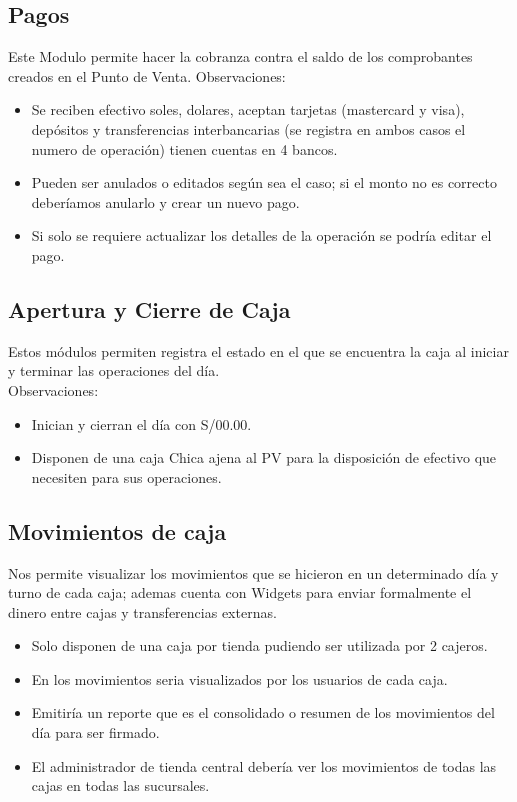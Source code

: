 \documentclass[pdftex,12pt,oneside,a4paper,spanish, english, brazil]{abntex2}
\begin{document}
\begin{sloppypar}
              \subsection{Pagos}
              Este Modulo permite hacer la cobranza contra el saldo de los comprobantes creados en el Punto de Venta.
              Observaciones:
              \begin{itemize}
              	\item Se reciben efectivo soles, dolares, aceptan tarjetas (mastercard y visa), depósitos y transferencias interbancarias (se registra en ambos casos el numero de operación) tienen cuentas en 4 bancos.
              	\item Pueden ser anulados o editados según sea el caso; si el monto no es correcto deberíamos anularlo y crear un nuevo pago.
              	\item Si solo se requiere actualizar los detalles de la operación se podría editar el pago.
              \end{itemize}
              
              
              \subsection{Apertura y Cierre de Caja}
              Estos módulos permiten registra el estado en el que se encuentra la caja al iniciar y terminar las operaciones del día.\\
              Observaciones:
              \begin{itemize}
              	\item Inician y cierran el día con S/00.00.
              	\item Disponen de una caja Chica ajena al PV para la disposición de efectivo que necesiten para sus operaciones.
              \end{itemize}
              \subsection{Movimientos de caja}
              Nos permite visualizar los movimientos que se hicieron en un determinado día y turno de cada caja; ademas cuenta con Widgets para enviar formalmente el dinero entre cajas y transferencias externas.
              \begin{itemize}
              	\item Solo disponen de una caja por tienda pudiendo ser utilizada por 2 cajeros.
              	\item En los movimientos seria visualizados por los usuarios de cada caja.
              	\item Emitiría un reporte que es el consolidado o resumen de los movimientos del día para ser firmado.
              	\item El administrador de tienda central debería ver los movimientos de todas las cajas en todas las sucursales.
              \end{itemize}

\end{sloppypar}
\end{document}
